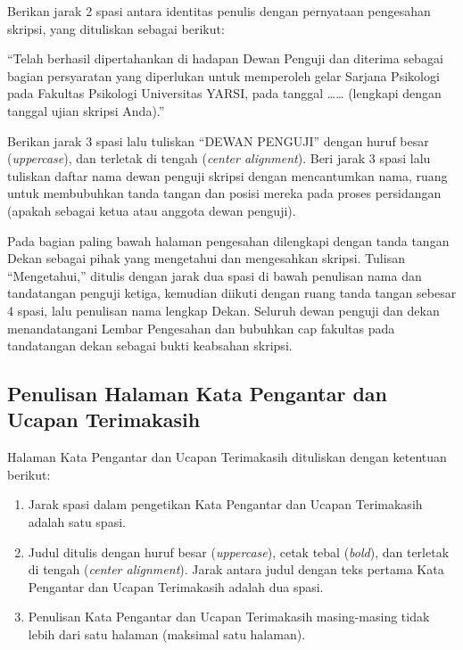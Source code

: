 \documentclass[
  indonesian,
  letterpaper,
]{scrbook}
\providecommand{\tightlist}{%
  \setlength{\itemsep}{0pt}\setlength{\parskip}{0pt}}
\begin{document}
Berikan jarak 2 spasi antara identitas penulis dengan pernyataan
pengesahan skripsi, yang dituliskan sebagai berikut:

``Telah berhasil dipertahankan di hadapan Dewan Penguji dan diterima
sebagai bagian persyaratan yang diperlukan untuk memperoleh gelar
Sarjana Psikologi pada Fakultas Psikologi Universitas YARSI, pada
tanggal \ldots\ldots{} (lengkapi dengan tanggal ujian skripsi Anda).''

Berikan jarak 3 spasi lalu tuliskan ``DEWAN PENGUJI'' dengan huruf besar
(\emph{uppercase}), dan terletak di tengah (\emph{center alignment}).
Beri jarak 3 spasi lalu tuliskan daftar nama dewan penguji skripsi
dengan mencantumkan nama, ruang untuk membubuhkan tanda tangan dan
posisi mereka pada proses persidangan (apakah sebagai ketua atau anggota
dewan penguji).

Pada bagian paling bawah halaman pengesahan dilengkapi dengan tanda
tangan Dekan sebagai pihak yang mengetahui dan mengesahkan skripsi.
Tulisan ``Mengetahui,'' ditulis dengan jarak dua spasi di bawah
penulisan nama dan tandatangan penguji ketiga, kemudian diikuti dengan
ruang tanda tangan sebesar 4 spasi, lalu penulisan nama lengkap Dekan.
Seluruh dewan penguji dan dekan menandatangani Lembar Pengesahan dan
bubuhkan cap fakultas pada tandatangan dekan sebagai bukti keabsahan
skripsi.

\subsection{Penulisan Halaman Kata Pengantar dan Ucapan
Terimakasih}\label{penulisan-halaman-kata-pengantar-dan-ucapan-terimakasih}

Halaman Kata Pengantar dan Ucapan Terimakasih dituliskan dengan
ketentuan berikut:

\begin{enumerate}
\def\labelenumi{\arabic{enumi}.}
\tightlist
\item
  Jarak spasi dalam pengetikan Kata Pengantar dan Ucapan Terimakasih
  adalah satu spasi.
\item
  Judul ditulis dengan huruf besar (\emph{uppercase}), cetak tebal
  (\emph{bold}), dan terletak di tengah (\emph{center alignment}). Jarak
  antara judul dengan teks pertama Kata Pengantar dan Ucapan Terimakasih
  adalah dua spasi.
\item
  Penulisan Kata Pengantar dan Ucapan Terimakasih masing-masing tidak
  lebih dari satu halaman (maksimal satu halaman).
\end{enumerate}
\end{document}
